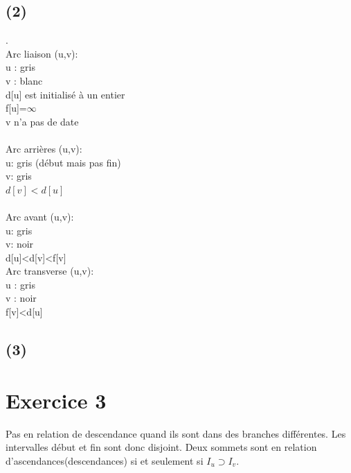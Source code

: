 \documentclass{article}
\begin{document}
\subsection*{(2)}
. \\
Arc liaison (u,v): \\
u : gris \\
v : blanc \\
d[u] est initialisé à un entier \\
f[u]=$\infty$ \\
v n'a pas de date \\
\\ 
Arc arrières (u,v): \\
u: gris (début mais pas fin) \\
v: gris \\
$d[v]<d[u]$ \\ 
\\
Arc avant (u,v): \\
u: gris \\
v: noir \\
d[u]<d[v]<f[v]
\\
Arc transverse (u,v): \\
u : gris \\
v : noir \\
f[v]<d[u]  \\
\subsection*{(3)}
\section*{Exercice 3}
Pas en relation de descendance quand ils sont dans des branches différentes. Les intervalles début et fin sont donc disjoint. Deux sommets sont en relation d'ascendances(descendances) si et seulement si $I_u \supset I_v$.
\newpage
\end{document}
